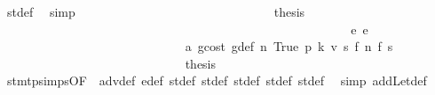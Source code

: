 \begin{isabellebody}
\ st{\isacharprime}{\kern0pt}{\isacharunderscore}{\kern0pt}def\ \isamarkupfalse%
\ simp\isanewline
\ \ \ \ \ \ \ \ \ \ \ \ \ \ \ \ \ \ \ \ \ \ \ \ \ \ \ \ \isamarkupfalse%
\ \isamarkupfalse%
\ {\isacharquery}{\kern0pt}thesis\ \isacommand{{\isachardot}{\kern0pt}}\isamarkupfalse%
\isanewline
\ \ \ \ \ \ \ \ \ \ \ \ \ \ \ \ \ \ \ \ \ \ \ \ \ \ \isamarkupfalse%
\isanewline
\ \ \ \ \ \ \ \ \ \ \ \ \ \ \ \ \ \ \ \ \ \ \ \ \ \ \ \ \isamarkupfalse%
\ {\isacharparenleft}{\kern0pt}e\ e{\isacharparenright}{\kern0pt}\isanewline
\ \ \ \ \ \ \ \ \ \ \ \ \ \ \ \ \ \ \ \ \ \ \ \ \ \ \ \ \isamarkupfalse%
\ a{}\ gcost\ g{\isacharunderscore}{\kern0pt}def\ n{}\ True\ p{}\ k{}\ v{}\ s{}\ f{}\ n{}\ f{}\ s{}\isanewline
\ \ \ \ \ \ \ \ \ \ \ \ \ \ \ \ \ \ \ \ \ \ \ \ \ \ \ \ \isamarkupfalse%
\ {\isacharquery}{\kern0pt}thesis\ \isamarkupfalse%
\ stmt{\isachardot}{\kern0pt}psimps{\isacharparenleft}{\kern0pt}{}{}{\isacharparenright}{\kern0pt}{\isacharbrackleft}{\kern0pt}OF\ {}{}{\isacharparenleft}{\kern0pt}{}{\isacharparenright}{\kern0pt}{\isacharbrackright}{\kern0pt}\ adv{\isacharunderscore}{\kern0pt}def\ e{\isacharprime}{\kern0pt}{\isacharunderscore}{\kern0pt}def\ st{\isacharprime}{\kern0pt}{\isacharunderscore}{\kern0pt}def\ st{\isacharprime}{\kern0pt}{\isacharprime}{\kern0pt}{\isacharunderscore}{\kern0pt}def\ st{\isacharprime}{\kern0pt}{\isacharprime}{\kern0pt}{\isacharprime}{\kern0pt}{\isacharunderscore}{\kern0pt}def\ st{\isacharprime}{\kern0pt}{\isacharprime}{\kern0pt}{\isacharprime}{\kern0pt}{\isacharprime}{\kern0pt}{\isacharunderscore}{\kern0pt}def\ st{\isacharprime}{\kern0pt}{\isacharprime}{\kern0pt}{\isacharprime}{\kern0pt}{\isacharprime}{\kern0pt}{\isacharprime}{\kern0pt}{\isacharunderscore}{\kern0pt}def\ \isamarkupfalse%
\ {\isacharparenleft}{\kern0pt}simp\ add{\isacharcolon}{\kern0pt}Let{\isacharunderscore}{\kern0pt}def{\isacharparenright}{\kern0pt}\isanewline
\ \ \ \ \ \ \ \ \ \ \ \ \ \ \ \ \ \ \ \ \ \ \ \ \ \ \isamarkupfalse%
\isanewline
\ \ \ \ \ \ \ \ \ \ \ \ \ \ \ \ \ \ \ \ \ \ \ \ \isamarkupfalse%
\isanewline
\ \ \ \ \ \ \ \ \ \ \ \ \ \ \ \ \ \ \ \ \ \ \isamarkupfalse%
\isanewline
\ \ \ \ \ \ \ \ \ \ \ \ \ \ \ \ \ \ \ \ \isamarkupfalse%
\isanewline
\ \ \ \ \ \ \ \ \ \ \ \ \ \ \ \ \ \ \ \ \ \ \isamarkupfalse%

\end{isabellebody}
